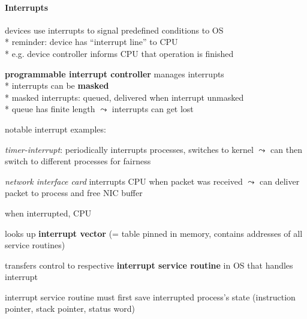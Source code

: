 \paragraph{Interrupts}
\begin{items}
	\item devices use interrupts to signal predefined conditions to OS \\*
		reminder: device has "`interrupt line"' to CPU \\*
		e.g. device controller informs CPU that operation is finished
	\item \textbf{programmable interrupt controller} manages interrupts \\*
		interrupts can be \textbf{masked} \\*
		masked interrupts: queued, delivered when interrupt unmasked \\*
		queue has finite length \( \leadsto \) interrupts can get lost
	\item notable interrupt examples:
	\begin{enumeration}
		\item \emph{timer-interrupt}: periodically interrupts processes, switches to kernel \( \leadsto \) can then switch to different processes for fairness
		\item \emph{network interface card} interrupts CPU when packet was received \( \leadsto \) can deliver packet to process and free NIC buffer
	\end{enumeration}
	\item when interrupted, CPU
	\begin{enumeration}
		\item looks up \textbf{interrupt vector} (= table pinned in memory, contains addresses of all service routines)
		\item transfers control to respective \textbf{interrupt service routine} in OS that handles interrupt
	\end{enumeration}
	\item interrupt service routine must first save interrupted process's state (instruction pointer, stack pointer, status word)
\end{items}

